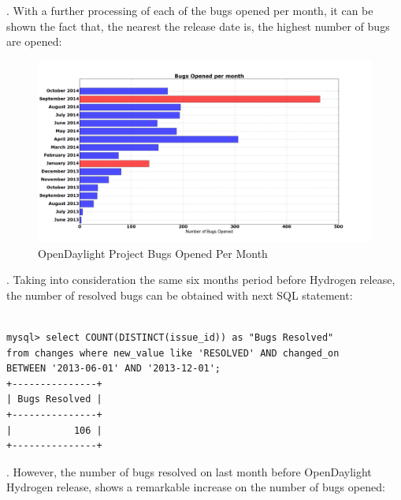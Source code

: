 \documentclass[a4paper, 12pt]{book}
\begin{document}
{\begin{verbatim}
\end{verbatim}
.
With a further processing of each of the bugs opened per month, it can be shown the fact that, the nearest the release date is, the highest number of bugs are opened:
\begin{center}
 \begin{figure}[H]
 \begin{center}
   \includegraphics[width=17cm]{img/bugs_opened_month_01.png}
   \caption{OpenDaylight Project Bugs Opened Per Month}
   \label{fig:odl_bugs_opened_month}
 \end{center}
 \end{figure}
\end{center}
. Taking into consideration the same six months period before Hydrogen release, the number of resolved bugs can be obtained with next SQL statement:
\begin{verbatim}

mysql> select COUNT(DISTINCT(issue_id)) as "Bugs Resolved"
from changes where new_value like 'RESOLVED' AND changed_on
BETWEEN '2013-06-01' AND '2013-12-01';
+---------------+
| Bugs Resolved |
+---------------+
|           106 |
+---------------+

\end{verbatim}
. However, the number of bugs resolved on last month before OpenDaylight Hydrogen release, shows a remarkable increase on the number of bugs opened:

}
\end{document}
